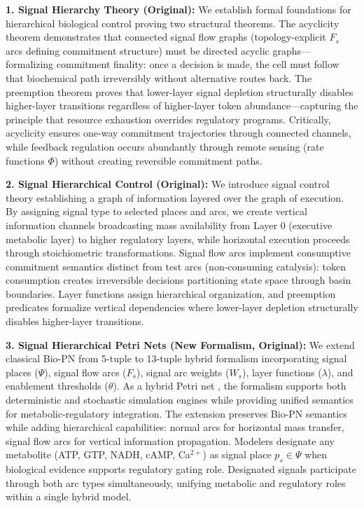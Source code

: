 \documentclass[10pt,letterpaper]{article}
\begin{document}
\textbf{1. Signal Hierarchy Theory (Original):} We establish formal foundations for hierarchical biological control proving two structural theorems. The acyclicity theorem demonstrates that connected signal flow graphs (topology-explicit $F_s$ arcs defining commitment structure) must be directed acyclic graphs---formalizing commitment finality: once a decision is made, the cell must follow that biochemical path irreversibly without alternative routes back. The preemption theorem proves that lower-layer signal depletion structurally disables higher-layer transitions regardless of higher-layer token abundance---capturing the principle that resource exhaustion overrides regulatory programs. Critically, acyclicity ensures one-way commitment trajectories through connected channels, while feedback regulation occurs abundantly through remote sensing (rate functions $\Phi$) without creating reversible commitment paths.

\textbf{2. Signal Hierarchical Control (Original):} We introduce signal control theory establishing a graph of information layered over the graph of execution. By assigning signal type to selected places and arcs, we create vertical information channels broadcasting mass availability from Layer 0 (executive metabolic layer) to higher regulatory layers, while horizontal execution proceeds through stoichiometric transformations. Signal flow arcs implement consumptive commitment semantics distinct from test arcs (non-consuming catalysis): token consumption creates irreversible decisions partitioning state space through basin boundaries. Layer functions assign hierarchical organization, and preemption predicates formalize vertical dependencies where lower-layer depletion structurally disables higher-layer transitions.

\textbf{3. Signal Hierarchical Petri Nets (New Formalism, Original):} We extend classical Bio-PN \cite{reisig1985,koch2011} from 5-tuple to 13-tuple hybrid formalism incorporating signal places ($\Psi$), signal flow arcs ($F_s$), signal arc weights ($W_s$), layer functions ($\lambda$), and enablement thresholds ($\theta$). As a hybrid Petri net \cite{alla1998,matsuno2003}, the formalism supports both deterministic and stochastic simulation engines \cite{goss1998} while providing unified semantics for metabolic-regulatory integration. The extension preserves Bio-PN semantics while adding hierarchical capabilities: normal arcs for horizontal mass transfer, signal flow arcs for vertical information propagation. Modelers designate any metabolite (ATP, GTP, NADH, cAMP, Ca$^{2+}$) as signal place $p_s \in \Psi$ when biological evidence supports regulatory gating role. Designated signals participate through both arc types simultaneously, unifying metabolic and regulatory roles within a single hybrid model.
\end{document}
